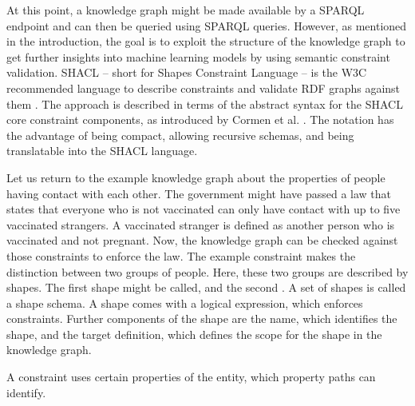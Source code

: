 
At this point, a knowledge graph might be made available by a SPARQL endpoint and can then be queried using SPARQL queries. However, as mentioned in the introduction, the goal is to exploit the structure of the knowledge graph to get further insights into machine learning models by using semantic constraint validation. SHACL -- short for Shapes Constraint Language -- is the W3C recommended language to describe constraints and validate RDF graphs against them \cite{knublauch2017shapes}. The approach is described in terms of the abstract syntax for the SHACL core constraint components, as introduced by Cormen et al. \cite{corman2018semantics}. The notation has the advantage of being compact, allowing recursive schemas, and being translatable into the SHACL language.

Let us return to the example knowledge graph about the properties of people having contact with each other. The government might have passed a law that states that everyone who is not vaccinated can only have contact with up to five vaccinated strangers. A vaccinated stranger is defined as another person who is vaccinated and not pregnant. Now, the knowledge graph can be checked against those constraints to enforce the law. The example constraint makes the distinction between two groups of people. Here, these two groups are described by shapes. The first shape might be called,  and the second . A set of shapes is called a shape schema. A shape comes with a logical expression, which enforces constraints. Further components of the shape are the name, which identifies the shape, and the target definition, which defines the scope for the shape in the knowledge graph. 

A constraint uses certain properties of the entity, which property paths can identify.

